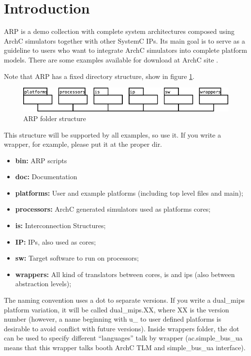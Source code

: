\documentclass[12pt]{article}
\begin{document}
\Topmatter

\section{Introduction}
ARP is a demo collection with complete system architectures composed using ArchC simulators together with other SystemC\cite{OSCI} IPs. Its main goal is
to serve as a guideline to users who want to integrate ArchC simulators into complete platform models. There are some examples available for download at ArchC site \cite{ARCHC}.

Note that ARP has a fixed directory structure, show in figure \ref{dual:arp}.

\begin{figure}[ht]
\centering
\includegraphics[scale=0.5]{diag_estrutura.png}
\caption{ARP folder structure}
\label{dual:arp}
\end{figure}

This structure will be supported by all examples, so use it. If you
write a wrapper, for example, please put it at the proper dir.
\begin{itemize}
\item \textbf{bin:} ARP scripts
\item \textbf{doc:} Documentation
\item \textbf{platforms:} User and example platforms (including
 top level files and main);
\item \textbf{processors:} ArchC generated simulators used as
platforms cores;
\item \textbf{is:} Interconnection Structures;
\item \textbf{IP:} IPs, also used as cores;
\item \textbf{sw:} Target software to run on processors;
\item \textbf{wrappers:} All kind of translators between cores, is and
ips (also between abstraction levels);
\end{itemize}

The naming convention uses a dot to separate versions. If you write a
dual\_mips platform variation, it will be called dual\_mips.XX, where
XX is the version number (however, a name beginning with u\_ to user
defined platforms is desirable to avoid conflict with future
versions). Inside wrappers folder, the dot can be used to specify
different ``languages'' talk by wrapper (ac.simple\_bus\_ua means that
this wrapper talks booth ArchC TLM and simple\_bus\_ua interface).
\end{document}
